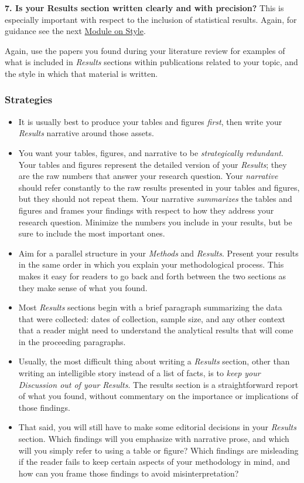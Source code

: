 \documentclass[
]{book}
\begin{document}
\textbf{7. Is your Results section written clearly and with precision?} This is especially important with respect to the inclusion of statistical results. Again, for guidance see the next \protect\hyperlink{style}{Module on Style}.

Again, use the papers you found during your literature review for examples of what is included in \emph{Results} sections within publications related to your topic, and the style in which that material is written.

\hypertarget{strategies-3}{%
\subsubsection*{Strategies}\label{strategies-3}}

\begin{itemize}
\item
  It is usually best to produce your tables and figures \emph{first}, then write your \emph{Results} narrative around those assets.
\item
  You want your tables, figures, and narrative to be \emph{strategically redundant}. Your tables and figures represent the detailed version of your \emph{Results}; they are the raw numbers that answer your research question. Your \emph{narrative} should refer constantly to the raw results presented in your tables and figures, but they should not repeat them. Your narrative \emph{summarizes} the tables and figures and frames your findings with respect to how they address your research question. Minimize the numbers you include in your results, but be sure to include the most important ones.
\item
  Aim for a parallel structure in your \emph{Methods} and \emph{Results}. Present your results in the same order in which you explain your methodological process. This makes it easy for readers to go back and forth between the two sections as they make sense of what you found.
\item
  Most \emph{Results} sections begin with a brief paragraph summarizing the data that were collected: dates of collection, sample size, and any other context that a reader might need to understand the analytical results that will come in the proceeding paragraphs.
\item
  Usually, the most difficult thing about writing a \emph{Results} section, other than writing an intelligible story instead of a list of facts, is to \emph{keep your Discussion out of your Results}. The results section is a straightforward report of what you found, without commentary on the importance or implications of those findings.
\item
  That said, you will still have to make some editorial decisions in your \emph{Results} section. Which findings will you emphasize with narrative prose, and which will you simply refer to using a table or figure? Which findings are misleading if the reader fails to keep certain aspects of your methodology in mind, and how can you frame those findings to avoid misinterpretation?
\end{itemize}
\end{document}
